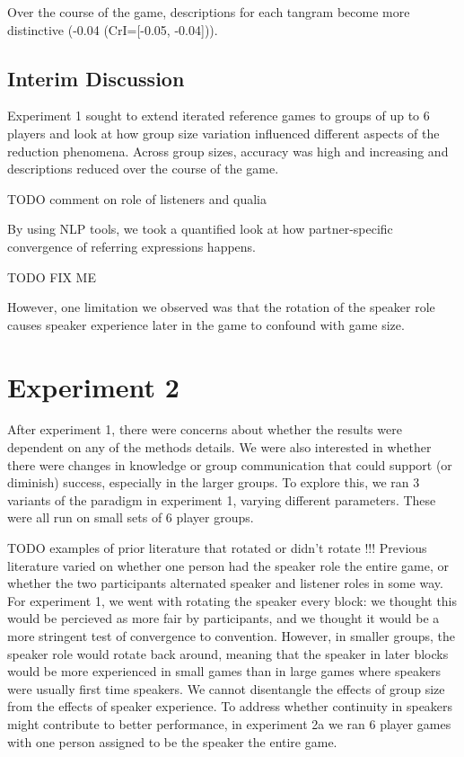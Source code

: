 \documentclass[
  english,
  a4paper,
]{article}
\begin{document}
Over the course of the game, descriptions for each tangram become more distinctive (-0.04 (CrI={[}-0.05, -0.04{]})).

\hypertarget{interim-discussion}{%
\subsection{Interim Discussion}\label{interim-discussion}}

Experiment 1 sought to extend iterated reference games to groups of up to 6 players and look at how group size variation influenced different aspects of the reduction phenomena. Across group sizes, accuracy was high and increasing and descriptions reduced over the course of the game.

TODO comment on role of listeners and qualia

By using NLP tools, we took a quantified look at how partner-specific convergence of referring expressions happens.

TODO FIX ME

However, one limitation we observed was that the rotation of the speaker role causes speaker experience later in the game to confound with game size.

\hypertarget{experiment-2}{%
\section{Experiment 2}\label{experiment-2}}

After experiment 1, there were concerns about whether the results were dependent on any of the methods details. We were also interested in whether there were changes in knowledge or group communication that could support (or diminish) success, especially in the larger groups. To explore this, we ran 3 variants of the paradigm in experiment 1, varying different parameters. These were all run on small sets of 6 player groups.

TODO examples of prior literature that rotated or didn't rotate !!!
Previous literature varied on whether one person had the speaker role the entire game, or whether the two participants alternated speaker and listener roles in some way. For experiment 1, we went with rotating the speaker every block: we thought this would be percieved as more fair by participants, and we thought it would be a more stringent test of convergence to convention. However, in smaller groups, the speaker role would rotate back around, meaning that the speaker in later blocks would be more experienced in small games than in large games where speakers were usually first time speakers. We cannot disentangle the effects of group size from the effects of speaker experience. To address whether continuity in speakers might contribute to better performance, in experiment 2a we ran 6 player games with one person assigned to be the speaker the entire game.
\end{document}
